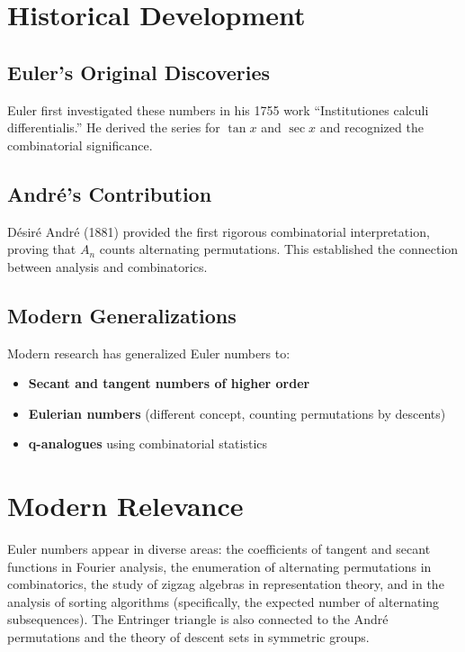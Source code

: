 \section{Historical Development}

\subsection{Euler's Original Discoveries}

Euler first investigated these numbers in his 1755 work ``Institutiones calculi differentialis.''
He derived the series for $\tan x$ and $\sec x$ and recognized the combinatorial significance.

\subsection{Andr\'{e}'s Contribution}

D\'{e}sir\'{e} Andr\'{e} (1881) provided the first rigorous combinatorial interpretation,
proving that $A_n$ counts alternating permutations. This established the connection
between analysis and combinatorics.

\subsection{Modern Generalizations}

Modern research has generalized Euler numbers to:
\begin{itemize}
\item \textbf{Secant and tangent numbers of higher order}
\item \textbf{Eulerian numbers} (different concept, counting permutations by descents)
\item \textbf{q-analogues} using combinatorial statistics
\end{itemize}

\section{Modern Relevance}

Euler numbers appear in diverse areas: the coefficients of tangent and secant
functions in Fourier analysis, the enumeration of alternating permutations in
combinatorics, the study of zigzag algebras in representation theory, and in
the analysis of sorting algorithms (specifically, the expected number of
alternating subsequences). The Entringer triangle is also connected to the
Andr\'{e} permutations and the theory of descent sets in symmetric groups.

